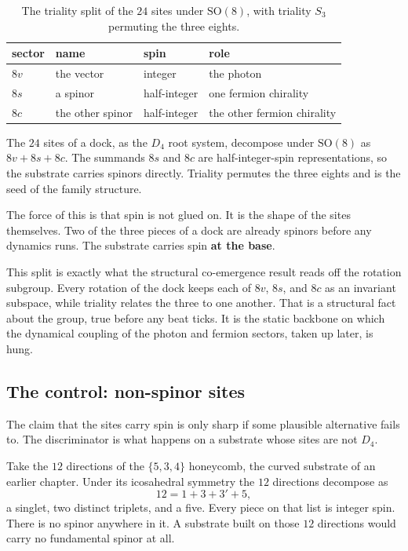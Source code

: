 \begin{table}[ht]
\centering
\begin{tabular}{@{}llll@{}}
\toprule
sector & name & spin & role \\
\midrule
$8v$ & the vector & integer & the photon \\
$8s$ & a spinor & half-integer & one fermion chirality \\
$8c$ & the other spinor & half-integer & the other fermion chirality \\
\bottomrule
\end{tabular}
\caption{The triality split of the $24$ sites under $\mathrm{SO}(8)$, with triality $S_3$ permuting the three
eights.}
\label{tab:triality-split}
\end{table}

\begin{proposition}
The $24$ sites of a dock, as the $D_4$ root system, decompose under $\mathrm{SO}(8)$ as $8v + 8s + 8c$. The
summands $8s$ and $8c$ are half-integer-spin representations, so the substrate carries spinors directly. Triality
permutes the three eights and is the seed of the family structure.
\end{proposition}

The force of this is that spin is not glued on. It is the shape of the sites themselves. Two of the three pieces
of a dock are already spinors before any dynamics runs. The substrate carries spin \textbf{at the base}.

This split is exactly what the structural co-emergence result reads off the rotation subgroup. Every rotation of
the dock keeps each of $8v$, $8s$, and $8c$ as an invariant subspace, while triality relates the three to one
another. That is a structural fact about the group, true before any beat ticks. It is the static backbone on
which the dynamical coupling of the photon and fermion sectors, taken up later, is hung.

\subsection{The control: non-spinor sites}

The claim that the sites carry spin is only sharp if some plausible alternative fails to. The discriminator is
what happens on a substrate whose sites are not $D_4$.

Take the $12$ directions of the $\{5,3,4\}$ honeycomb, the curved substrate of an earlier chapter. Under its
icosahedral symmetry the $12$ directions decompose as
\[
12 = 1 + 3 + 3' + 5,
\]
a singlet, two distinct triplets, and a five. Every piece on that list is integer spin. There is no spinor
anywhere in it. A substrate built on those $12$ directions would carry no fundamental spinor at all.

